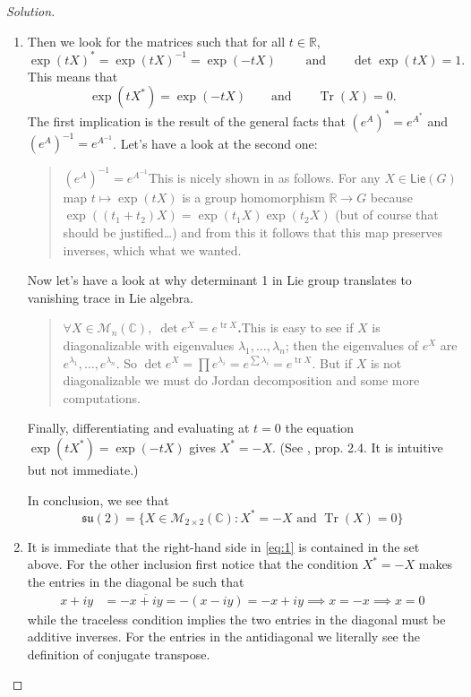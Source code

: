 \begin{proof}[Solution]
\begin{enumerate}[label=\alph*.]
\begin{enumerate}[label=\textbf{Step \arabic*}]
					\item Then we look for the matrices such that for all $t\in\mathbb{R}$,
						\[\operatorname{exp}(tX)^* =\operatorname{exp}(tX)^{-1}=\operatorname{exp}(-tX) \qquad \text{ and} \qquad \det \operatorname{exp}(tX)=1. \]
						This means that
						\[\operatorname{exp}(tX^*) =\operatorname{exp}(-tX) \qquad \text{and} \qquad \operatorname{ Tr}(X)=0.\]
						The first implication is the result of the general facts that $(e^{A})^*=e^{A^*}$ and $(e^A)^{-1}=e^{A^{-1}}$. Let's have a look at the second one:
\begin{quotation}
	{\color{3}$(e^A)^{-1}=e^{A^{-1}}$}\hspace{.5em}This is nicely shown in \cite{lee} as follows. For any $X\in\mathsf{Lie}(G)$ map $t\mapsto \operatorname{exp}(tX)$ is a group homomorphism  $\mathbb{R}\to G$ because $\operatorname{exp}((t_1+t_2)X)=\operatorname{exp}(t_1X)\operatorname{exp}(t_2X)$ (but of course that should be justified…) and from this it follows that this map preserves inverses, which what we wanted.
\end{quotation}

						Now let's have a look at why determinant 1 in Lie group translates to vanishing trace in Lie algebra.
\begin{quotation}
	{\color{3}\bfseries $\forall X\in\mathcal{M}_{n}(\mathbb{C}), \;\det e^X=e^{\operatorname{tr}X}$.}\hspace{.5em}This is easy to see if $X$ is diagonalizable with eigenvalues  $\lambda_1,\ldots,\lambda_n$; then the eigenvalues of $e^{X}$ are $e^{\lambda_1},\ldots,e^{\lambda_n}$. So $\det e^X=\prod e^{\lambda_i}=e^{\sum \lambda_i}=e^{\operatorname{tr}X}$. But if $X$ is not diagonalizable we must do Jordan decomposition and some more computations.
\end{quotation}

						Finally, differentiating and evaluating at $t=0$ the equation $\operatorname{exp}(tX^*) =\operatorname{exp}(-tX)$ gives $X^*=-X$. (See \cite{hall}, prop. 2.4. It is intuitive but not immediate.)

						In conclusion, we see that
						\[\mathfrak{su}(2)=\{X\in\mathcal{M}_{2\times 2}(\mathbb{C}):X^* =-X\text{ and }\operatorname{Tr}(X)=0 \}\]
		
					\item It is immediate that the right-hand side in \cref{eq:1} is contained in the set above. For the other inclusion first notice that the condition $X^*=-X$ makes the entries in the diagonal be such that
						\begin{align*}							x+iy&=-\overline{x+iy}=-(x-iy)=-x+iy\implies x=-x\implies x=0						\end{align*}
						while the traceless condition implies the two entries in the diagonal must be additive inverses. For the entries in the antidiagonal we literally see the definition of conjugate transpose.
				\end{enumerate}


\end{enumerate}
\end{proof}
